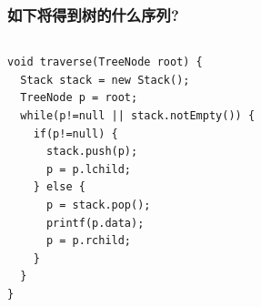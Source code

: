 \begin{frame}[fragile]
  \frametitle{如下将得到树的什么序列?}
  \begin{columns}[T]
    \begin{verbatim}
void traverse(TreeNode root) {
  Stack stack = new Stack();
  TreeNode p = root;
  while(p!=null || stack.notEmpty()) {
    if(p!=null) {
      stack.push(p);
      p = p.lchild;
    } else {
      p = stack.pop();
      printf(p.data);
      p = p.rchild;
    }
  }
}
    \end{verbatim}

  \end{columns}  
\end{frame}

